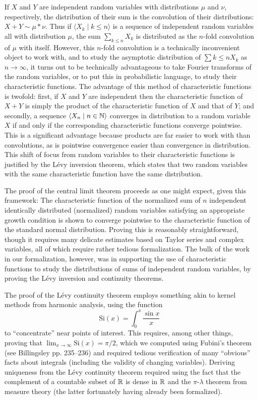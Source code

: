 \documentclass{amsart}
\theoremstyle{definition}
\theoremstyle{remark}
\newcommand{\bldseq}[2]{\langle{#1}\mid{#2}\rangle}
\newcommand\Si{\text{Si}}
\begin{document}
If $X$ and $Y$ are independent random variables with distributions $\mu$ and $\nu$, respectively, the distribution of their sum is the convolution of their distributions: $X + Y \sim \mu * \nu$. Thus if $\bldseq{X_k}{k \le n}$ is a sequence of independent random variables all with distribution $\mu$, the sum $\sum_{k \le n} X_k$ is distributed as the $n$-fold convolution of $\mu$ with itself. However, this $n$-fold convolution is a technically inconvenient object to work with, and to study the asymptotic distribution of $\sum{k \le n} X_k$ as $n \rightarrow \infty$, it turns out to be technically advantageous to take Fourier transforms of the random variables, or to put this in probabilistic language, to study their characteristic functions. The advantage of this method of characteristic functions is twofold: first, if $X$ and $Y$ are independent then the characteristic function of $X + Y$ is simply the product of the characteristic function of $X$ and that of $Y$; and secondly, a sequence $\bldseq{X_n}{n \in \N}$ converges in distribution to a random variable $X$ if and only if the corresponding characteristic functions converge pointwise. This is a significant advantage because products are far easier to work with than convolutions, as is pointwise convergence easier than convergence in distribution. This shift of focus from random variables to their characteristic functions is justified by the L\'evy inversion theorem, which states that two random variables with the same characteristic function have the same distribution.

The proof of the central limit theorem proceeds as one might expect, given this framework: The characteristic function of the normalized sum of $n$ independent identically distributed (normalized) random variables satisfying an appropriate growth condition is shown to converge pointwise to the characteristic function of the standard normal distribution. Proving this is reasonably straightforward, though it requires many delicate estimates based on Taylor series and complex variables, all of which require rather tedious formalization. The bulk of the work in our formalization, however, was in supporting the use of characteristic functions to study the distributions of sums of independent random variables, by proving the L\'evy inversion and continuity theorems.

The proof of the L\'evy continuity theorem employs something akin to kernel methods from harmonic analysis, using the function
\[ \Si(x) = \int_0^x \frac{\sin x}{x} \]
to ``concentrate'' near points of interest. This requires, among other things, proving that $\lim_{x \rightarrow \infty} \Si(x) = \pi/2$, which we computed using Fubini's theorem (see Billingsley pp. 235--236) and required tedious verification of many ``obvious'' facts about integrals (including the validity of changing variables). Deriving uniqueness from the L\'evy continuity theorem required using the fact that the complement of a countable subset of $\mathbb{R}$ is dense in $\mathbb{R}$ and the $\pi$-$\lambda$ theorem from measure theory (the latter fortunately having already been formalized).
\end{document}
